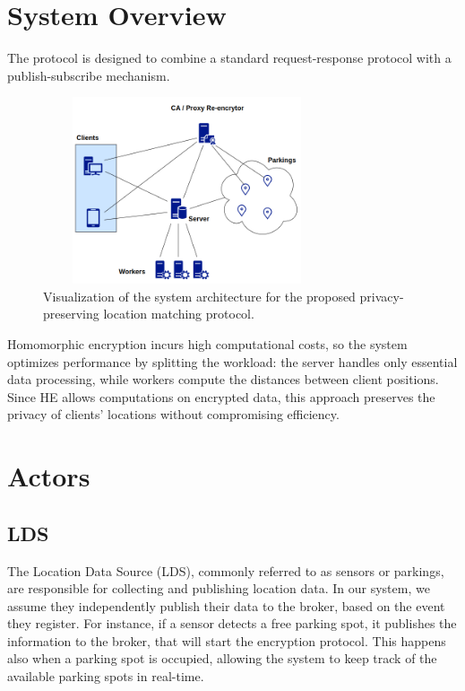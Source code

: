 \section{System Overview}
The protocol is designed to combine a standard request-response protocol with a publish-subscribe mechanism.


\begin{figure}[h]
    \centering
    \includegraphics[width=8.5cm,height=5.5cm]{img/architecture-scheme.png}
    \caption{Visualization of the system architecture for the proposed privacy-preserving location matching protocol.}
    \label{fig:architecture}
\end{figure}

Homomorphic encryption incurs high computational costs, so the system optimizes performance by splitting the workload: the server handles only essential data processing, while workers compute the distances between client positions. Since HE allows computations on encrypted data, this approach preserves the privacy of clients' locations without compromising efficiency.

\section{Actors}

\subsection{LDS}
The Location Data Source (LDS), commonly referred to as sensors or parkings, are responsible for collecting and publishing location data. In our system, we assume they independently publish their data to the broker, based on the event they register. For instance, if a sensor detects a free parking spot, it publishes the information to the broker, that will start the encryption protocol. This happens also when a parking spot is occupied, allowing the system to keep track of the available parking spots in real-time.

